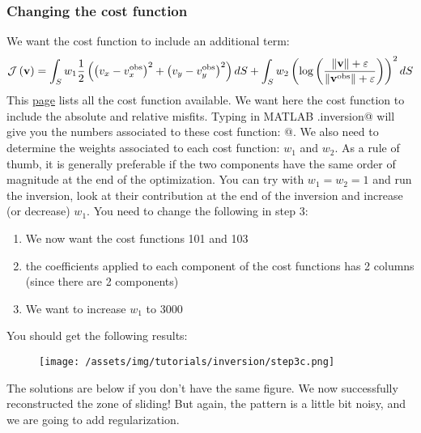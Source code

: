 \subsubsection{Changing the cost function}
We want the cost function to include an additional term:
\begin{equation}
	{\mathcal J\left({\bf v}\right)}
	=\int_{S} w_1 \dfrac{1}{2}\left(
	\left(v_x-v_x^{\text{obs}}\right)^{2}
	+\left(v_y-v_y^{\text{obs}}\right)^{2}
	\right) dS
	+\int_{S} w_2 \left(\text{log}\left(
	\dfrac{\|{\bf v}\|+\varepsilon}{\|{\bf v}^{\text{obs}}\|+\varepsilon}
	\right) \right)^2 dS
\end{equation}
This \href{http://issm.jpl.nasa.gov/documentation/inversions/}{page} lists all the cost function available. We want here the cost function to include the absolute and relative misfits. Typing in MATLAB \verb@md.inversion@ will give you the numbers associated to these cost function: \verb@[101,103]@. We also need to determine the weights associated to each cost function: $w_1$ and $w_2$. As a rule of thumb, it is generally preferable if the two components have the same order of magnitude at the end of the optimization. You can try with $w_1=w_2=1$ and run the inversion, look at their contribution at the end of the inversion and increase (or decrease) $w_1$. You need to change the following in step 3:
\begin{enumerate}
	\item We now want the cost functions 101 and 103
	\item the coefficients applied to each component of the cost functions has 2 columns (since there are 2 components)
	\item We want to increase $w_1$ to 3000
\end{enumerate}
You should get the following results:
\begin{figure}[H]
	\begin{center}
		\texttt{[image: /assets/img/tutorials/inversion/step3c.png]}
	\end{center}
\end{figure}
The solutions are below if you don't have the same figure. We now successfully reconstructed the zone of sliding! But again, the pattern is a little bit noisy, and we are going to add regularization.

